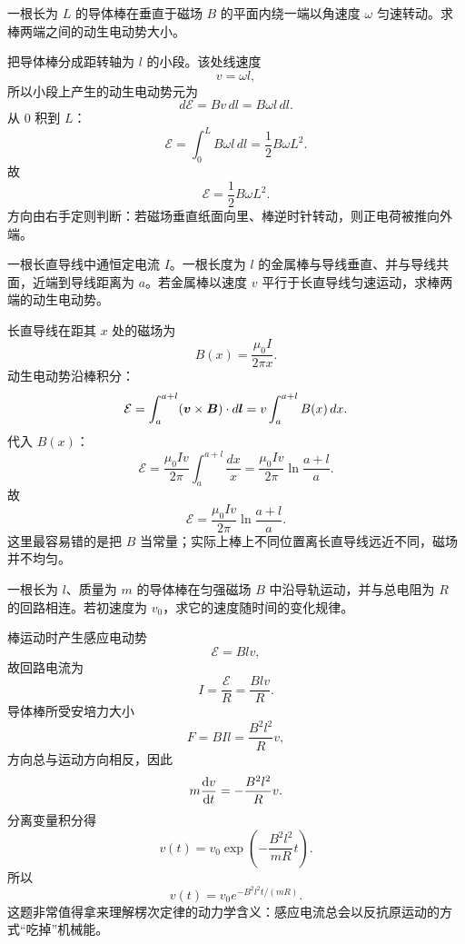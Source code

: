 \documentclass[lang=cn,11pt]{elegantbook}
\begin{document}
\begin{example}[转动导体棒两端的动生电动势]
一根长为 \(L\) 的导体棒在垂直于磁场 \(B\) 的平面内绕一端以角速度 \(\omega\) 匀速转动。求棒两端之间的动生电动势大小。
\end{example}

\begin{solution}
把导体棒分成距转轴为 \(l\) 的小段。该处线速度
\[
v=\omega l,
\]
所以小段上产生的动生电动势元为
\[
d\mathcal{E}=Bv\,dl=B\omega l\,dl.
\]
从 \(0\) 积到 \(L\)：
\[
\mathcal{E}=\int_0^L B\omega l\,dl
=\frac12 B\omega L^2.
\]
故
\[
\boxed{
\mathcal{E}=\frac12 B\omega L^2
}.
\]
方向由右手定则判断：若磁场垂直纸面向里、棒逆时针转动，则正电荷被推向外端。
\end{solution}

\begin{example}[长直导线旁移动金属棒的动生电动势]
一根长直导线中通恒定电流 \(I\)。一根长度为 \(l\) 的金属棒与导线垂直、并与导线共面，近端到导线距离为 \(a\)。若金属棒以速度 \(v\) 平行于长直导线匀速运动，求棒两端的动生电动势。
\end{example}

\begin{solution}
长直导线在距其 \(x\) 处的磁场为
\[
B(x)=\frac{\mu_0I}{2\pi x}.
\]
动生电动势沿棒积分：
\[
\mathcal{E}=\int_a^{a+l}(\vb*{v}\times\vb*{B})\cdot d\vb*{l}
=v\int_a^{a+l}B(x)\,dx.
\]
代入 \(B(x)\)：
\[
\mathcal{E}
=\frac{\mu_0Iv}{2\pi}\int_a^{a+l}\frac{dx}{x}
=\frac{\mu_0Iv}{2\pi}\ln\frac{a+l}{a}.
\]
故
\[
\boxed{
\mathcal{E}=\frac{\mu_0Iv}{2\pi}\ln\frac{a+l}{a}
}.
\]
这里最容易错的是把 \(B\) 当常量；实际上棒上不同位置离长直导线远近不同，磁场并不均匀。
\end{solution}

\begin{example}[磁场中的导体棒为何会指数减速]
一根长为 \(l\)、质量为 \(m\) 的导体棒在匀强磁场 \(B\) 中沿导轨运动，并与总电阻为 \(R\) 的回路相连。若初速度为 \(v_0\)，求它的速度随时间的变化规律。
\end{example}

\begin{solution}
棒运动时产生感应电动势
\[
\mathcal{E}=Blv,
\]
故回路电流为
\[
I=\frac{\mathcal{E}}{R}=\frac{Blv}{R}.
\]
导体棒所受安培力大小
\[
F=BIl=\frac{B^2l^2}{R}v,
\]
方向总与运动方向相反，因此
\[
m\dv{v}{t}=-\frac{B^2l^2}{R}v.
\]
分离变量积分得
\[
v(t)=v_0\exp\left(-\frac{B^2l^2}{mR}t\right).
\]
所以
\[
\boxed{
v(t)=v_0e^{-B^2l^2t/(mR)}
}.
\]
这题非常值得拿来理解楞次定律的动力学含义：感应电流总会以反抗原运动的方式“吃掉”机械能。
\end{solution}
\end{document}
